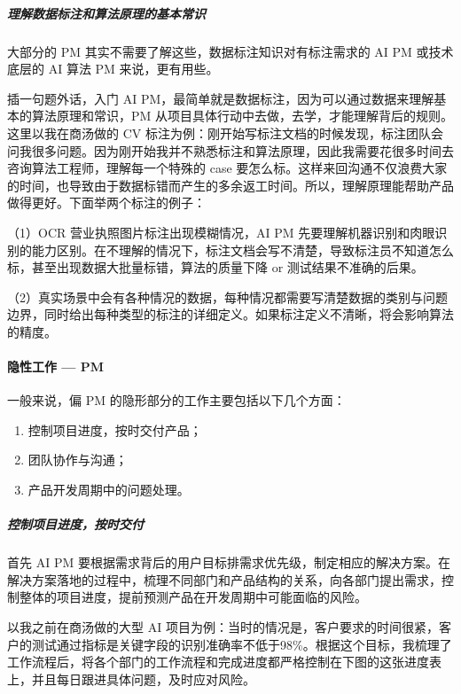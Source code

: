 \documentclass[letterpaper,11pt,english]{sphinxmanual}
\begin{document}
\subparagraph{理解数据标注和算法原理的基本常识}
\label{\detokenize{chapter_experience/recessive_work:id5}}
大部分的 PM 其实不需要了解这些，数据标注知识对有标注需求的 AI PM
或技术底层的 AI 算法 PM 来说，更有用些。

插一句题外话，入门 AI
PM，最简单就是数据标注，因为可以通过数据来理解基本的算法原理和常识，PM
从项目具体行动中去做，去学，才能理解背后的规则。 这里以我在商汤做的 CV
标注为例：刚开始写标注文档的时候发现，标注团队会问我很多问题。因为刚开始我并不熟悉标注和算法原理，因此我需要花很多时间去咨询算法工程师，理解每一个特殊的
case
要怎么标。这样来回沟通不仅浪费大家的时间，也导致由于数据标错而产生的多余返工时间。所以，理解原理能帮助产品做得更好。下面举两个标注的例子：

（1）OCR 营业执照图片标注出现模糊情况，AI PM
先要理解机器识别和肉眼识别的能力区别。在不理解的情况下，标注文档会写不清楚，导致标注员不知道怎么标，甚至出现数据大批量标错，算法的质量下降
or 测试结果不准确的后果。

（2）真实场景中会有各种情况的数据，每种情况都需要写清楚数据的类别与问题边界，同时给出每种类型的标注的详细定义。如果标注定义不清晰，将会影响算法的精度。


\paragraph{隐性工作 — PM}
\label{\detokenize{chapter_experience/recessive_work:pm}}
一般来说，偏 PM 的隐形部分的工作主要包括以下几个方面：
\begin{enumerate}
%
\item {} 
控制项目进度，按时交付产品；

\item {} 
团队协作与沟通；

\item {} 
产品开发周期中的问题处理。

\end{enumerate}


\subparagraph{控制项目进度，按时交付}
\label{\detokenize{chapter_experience/recessive_work:id6}}
首先 AI PM
要根据需求背后的用户目标排需求优先级，制定相应的解决方案。在解决方案落地的过程中，梳理不同部门和产品结构的关系，向各部门提出需求，控制整体的项目进度，提前预测产品在开发周期中可能面临的风险。

以我之前在商汤做的大型 AI
项目为例：当时的情况是，客户要求的时间很紧，客户的测试通过指标是关键字段的识别准确率不低于98\%。根据这个目标，我梳理了工作流程后，将各个部门的工作流程和完成进度都严格控制在下图的这张进度表上，并且每日跟进具体问题，及时应对风险。
\end{document}
